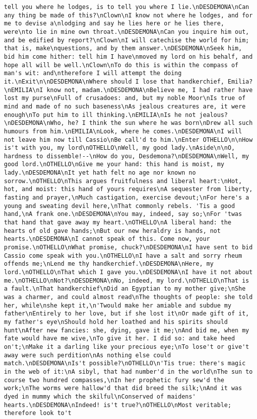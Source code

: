 \begin{verbatim}
tell you where he lodges, is to tell you where I lie.\nDESDEMONA\nCan any thing be made of this?\nClown\nI know not where he lodges, and for me to devise a\nlodging and say he lies here or he lies there, were\nto lie in mine own throat.\nDESDEMONA\nCan you inquire him out, and be edified by report?\nClown\nI will catechise the world for him; that is, make\nquestions, and by them answer.\nDESDEMONA\nSeek him, bid him come hither: tell him I have\nmoved my lord on his behalf, and hope all will be well.\nClown\nTo do this is within the compass of man's wit: and\ntherefore I will attempt the doing it.\nExit\n\nDESDEMONA\nWhere should I lose that handkerchief, Emilia?\nEMILIA\nI know not, madam.\nDESDEMONA\nBelieve me, I had rather have lost my purse\nFull of crusadoes: and, but my noble Moor\nIs true of mind and made of no such baseness\nAs jealous creatures are, it were enough\nTo put him to ill thinking.\nEMILIA\nIs he not jealous?\nDESDEMONA\nWho, he? I think the sun where he was born\nDrew all such humours from him.\nEMILIA\nLook, where he comes.\nDESDEMONA\nI will not leave him now till Cassio\nBe call'd to him.\nEnter OTHELLO\n\nHow is't with you, my lord\nOTHELLO\nWell, my good lady.\nAside\n\nO, hardness to dissemble!--\nHow do you, Desdemona?\nDESDEMONA\nWell, my good lord.\nOTHELLO\nGive me your hand: this hand is moist, my lady.\nDESDEMONA\nIt yet hath felt no age nor known no sorrow.\nOTHELLO\nThis argues fruitfulness and liberal heart:\nHot, hot, and moist: this hand of yours requires\nA sequester from liberty, fasting and prayer,\nMuch castigation, exercise devout;\nFor here's a young and sweating devil here,\nThat commonly rebels. 'Tis a good hand,\nA frank one.\nDESDEMONA\nYou may, indeed, say so;\nFor 'twas that hand that gave away my heart.\nOTHELLO\nA liberal hand: the hearts of old gave hands;\nBut our new heraldry is hands, not hearts.\nDESDEMONA\nI cannot speak of this. Come now, your promise.\nOTHELLO\nWhat promise, chuck?\nDESDEMONA\nI have sent to bid Cassio come speak with you.\nOTHELLO\nI have a salt and sorry rheum offends me;\nLend me thy handkerchief.\nDESDEMONA\nHere, my lord.\nOTHELLO\nThat which I gave you.\nDESDEMONA\nI have it not about me.\nOTHELLO\nNot?\nDESDEMONA\nNo, indeed, my lord.\nOTHELLO\nThat is a fault.\nThat handkerchief\nDid an Egyptian to my mother give;\nShe was a charmer, and could almost read\nThe thoughts of people: she told her, while\nshe kept it,\n'Twould make her amiable and subdue my father\nEntirely to her love, but if she lost it\nOr made gift of it, my father's eye\nShould hold her loathed and his spirits should hunt\nAfter new fancies: she, dying, gave it me;\nAnd bid me, when my fate would have me wive,\nTo give it her. I did so: and take heed on't;\nMake it a darling like your precious eye;\nTo lose't or give't away were such perdition\nAs nothing else could match.\nDESDEMONA\nIs't possible?\nOTHELLO\n'Tis true: there's magic in the web of it:\nA sibyl, that had number'd in the world\nThe sun to course two hundred compasses,\nIn her prophetic fury sew'd the work;\nThe worms were hallow'd that did breed the silk;\nAnd it was dyed in mummy which the skilful\nConserved of maidens' hearts.\nDESDEMONA\nIndeed! is't true?\nOTHELLO\nMost veritable; therefore look to't 
\end{verbatim}
